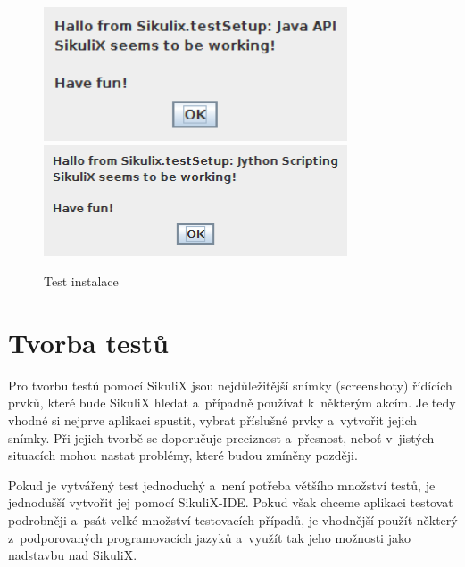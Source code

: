 	\begin{figure}[ht!]
		\centering
		\caption{Test instalace}
		\label{InstalOK}
		\includegraphics[width=9cm]{img/Instalace/InstalaceOK.png}\\[0.3cm]
		\includegraphics[width=9cm]{img/Instalace/InstalaceOK1.png}
	\end{figure}
	
	\section{Tvorba testů}
	Pro tvorbu testů pomocí SikuliX jsou nejdůležitější snímky (screenshoty) řídících prvků, které bude SikuliX hledat a~případně používat k~některým akcím. Je tedy vhodné si nejprve aplikaci spustit, vybrat příslušné prvky a~vytvořit jejich snímky. Při jejich tvorbě se doporučuje preciznost a~přesnost, neboť v~jistých situacích mohou nastat problémy, které budou zmíněny později.
	
	Pokud je vytvářený test jednoduchý a~není potřeba většího množství testů, je jednodušší vytvořit jej pomocí SikuliX-IDE. Pokud však chceme aplikaci testovat podrobněji a~psát velké množství testovacích případů, je vhodnější použít některý z~podporovaných programovacích jazyků a~využít tak jeho možnosti jako nadstavbu nad SikuliX.
	
